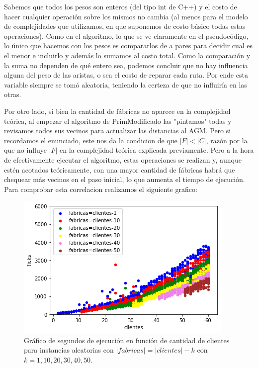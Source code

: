 \documentclass[A4paper,oneside,fleqn,11pt]{article}
\theoremstyle{definition}
\begin{document}
\normalsize

Sabemos que todos los pesos son enteros (del tipo int de C++) y el costo de hacer cualquier operación sobre los mismos no cambia (al menos para el modelo de complejidades que utilizamos, en que suponemos de costo básico todas estas operaciones). Como en el algoritmo, lo que se ve claramente en el pseudocódigo, lo único que hacemos con los pesos es compararlos de a pares para decidir cual es el menor e incluirlo y además lo sumamos al costo total. Como la comparación y la suma no dependen de qué entero sea, podemos concluir que no hay influencia alguna del peso de las aristas, o sea el costo de reparar cada ruta. Por ende esta variable siempre se tomó aleatoria, teniendo la certeza de que no influiría en las otras. 

Por otro lado, si bien la cantidad de fábricas no aparece en la complejidad teórica, al empezar el algoritmo de PrimModificado las "pintamos" todas y revisamos todos sus vecinos para actualizar las distancias al AGM. Pero si recordamos el enunciado, este nos da la condicion de que  $|F|<|C|$, razón por la que no influye $|F|$ en la complejidad teórica explicada previamente. Pero a la hora de efectivamente ejecutar el algoritmo, estas operaciones se realizan y, aunque estén acotados teóricamente, con una mayor cantidad de fábricas habrá que chequear más vecinos en el paso inicial, lo que aumenta el tiempo de ejecución. Para comprobar esta correlacion realizamos el siguiente grafico:

\begin{figure}
\centering
\includegraphics[scale=0.6]{Fabricas-clientes.png}
\caption{ Gráfico de segundos de ejecución en función de cantidad de clientes para instancias aleatorias con $|fabricas|=|clientes|-k$ con $k=1, 10, 20, 30, 40, 50$.}
\end{figure}
\end{document}

